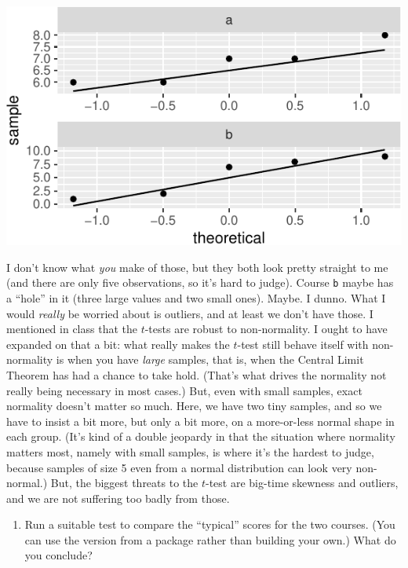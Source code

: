 \documentclass[]{tufte-book}
\providecommand{\tightlist}{%
  \setlength{\itemsep}{0pt}\setlength{\parskip}{0pt}}
\theoremstyle{definition}
\theoremstyle{definition}
\theoremstyle{definition}
\theoremstyle{remark}
\begin{document}
\includegraphics{07-sign-mood-median_files/figure-latex/unnamed-chunk-68-1}

I don't know what \emph{you} make of those, but they both look pretty
straight to me (and there are only five observations, so it's hard to
judge). Course \texttt{b} maybe has a ``hole'' in it (three large values
and two small ones). Maybe. I dunno. What I would \emph{really} be
worried about is outliers, and at least we don't have those. I mentioned
in class that the \(t\)-tests are robust to non-normality. I ought to
have expanded on that a bit: what really makes the \(t\)-test still
behave itself with non-normality is when you have \emph{large} samples,
that is, when the Central Limit Theorem has had a chance to take hold.
(That's what drives the normality not really being necessary in most
cases.) But, even with small samples, exact normality doesn't matter so
much. Here, we have two tiny samples, and so we have to insist a bit
more, but only a bit more, on a more-or-less normal shape in each group.
(It's kind of a double jeopardy in that the situation where normality
matters most, namely with small samples, is where it's the hardest to
judge, because samples of size 5 even from a normal distribution can
look very non-normal.) But, the biggest threats to the \(t\)-test are
big-time skewness and outliers, and we are not suffering too badly from
those.

\begin{enumerate}
\def\labelenumi{(\alph{enumi})}
\setcounter{enumi}{4}
\tightlist
\item
  Run a suitable test to compare the ``typical'' scores for the two
  courses. (You can use the version from a package rather than building
  your own.) What do you conclude?
\end{enumerate}
\end{document}

